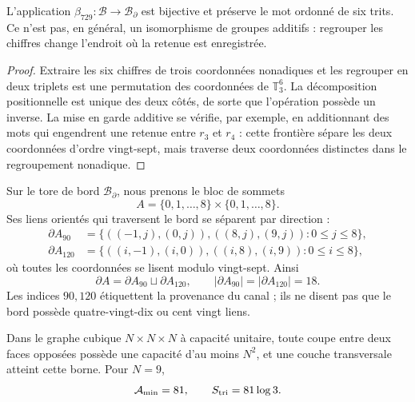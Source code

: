 \begin{proposition}
\label{rm:prop:modular-beta729}
L'application \(\beta_{729}:\mathcal B\to\mathcal B_\partial\) est bijective et
préserve le mot ordonné de six trits. Ce n'est pas, en général, un
isomorphisme de groupes additifs : regrouper les chiffres change l'endroit où
la retenue est enregistrée.
\end{proposition}

\begin{proof}
Extraire les six chiffres de trois coordonnées nonadiques et les regrouper en
deux triplets est une permutation des coordonnées de \(\mathbb T_3^6\). La
décomposition positionnelle est unique des deux côtés, de sorte que
l'opération possède un inverse. La mise en garde additive se vérifie, par exemple,
en additionnant des mots qui engendrent une retenue entre \(r_3\) et \(r_4\) : cette
frontière sépare les deux coordonnées d'ordre vingt-sept, mais traverse
deux coordonnées distinctes dans le regroupement nonadique.
\end{proof}

Sur le tore de bord \(\mathcal B_\partial\), nous prenons le bloc de sommets
\begin{equation}
\label{rm:eq:modular-block-A}
A=\{0,1,\ldots,8\}\times\{0,1,\ldots,8\}.
\end{equation}
Ses liens orientés qui traversent le bord se séparent par direction :
\begin{align}
\partial A_{90}
&=\{((-1,j),(0,j)),((8,j),(9,j)):0\leq j\leq8\},
\label{rm:eq:modular-boundary90}\\
\partial A_{120}
&=\{((i,-1),(i,0)),((i,8),(i,9)):0\leq i\leq8\},
\label{rm:eq:modular-boundary120}
\end{align}
où toutes les coordonnées se lisent modulo vingt-sept. Ainsi
\begin{equation}
\label{rm:eq:modular-boundary-counts}
\partial A=\partial A_{90}\sqcup\partial A_{120},
\qquad
|\partial A_{90}|=|\partial A_{120}|=18.
\end{equation}
Les indices \(90,120\) étiquettent la provenance du canal ; ils ne disent pas que
le bord possède quatre-vingt-dix ou cent vingt liens.

\begin{theorem}
\label{rm:thm:modular-triadic-cut}
Dans le graphe cubique \(N\times N\times N\) à capacité unitaire, toute
coupe entre deux faces opposées possède une capacité d'au moins \(N^2\), et une
couche transversale atteint cette borne. Pour \(N=9\),
\begin{equation}
\label{rm:eq:modular-mincut-entropy}
\mathcal A_{\min}=81,
\qquad
S_{\rm tri}=81\log3.
\end{equation}
\end{theorem}

